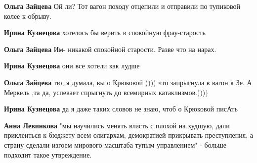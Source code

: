 \begin{itemize}
\begin{itemize}
\textbf{Ольга Зайцева} Ой ли? Тот вагон походу отцепили и отправили по тупиковой колее к обрыву.

 
\textbf{Ирина Кузнецова} хотелось бы верить в спокойную фрау-старость 👵🏼

 
\textbf{Ольга Зайцева} Им- никакой спокойной старости. Разве что на нарах.

 
\textbf{Ирина Кузнецова} они все хотели как лудше👹

 
\textbf{Ольга Зайцева} тю, я думала, вы о Крюковой )))) что запрыгнула в вагон к Зе. А Меркель ,та да, успевает спрыгнуть до всемирных катаклизмов.))))

 
\textbf{Ирина Кузнецова} да я даже таких словов не знаю, чтоб о Крюковой писАть🤣🤝

 
\textbf{Анна Левинкова} "мы научились менять власть с плохой на худшую, дали приклеиться к бюджету всем олигархам, демократией прикрывать преступления, а страну сделали изгоем мирового масштаба тупым управлением" - больше подходит такое утвреждение.


\end{itemize}
\end{itemize}
